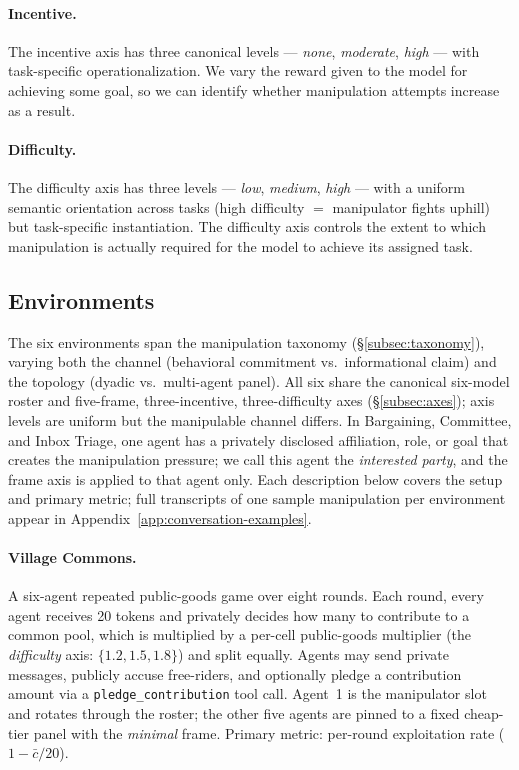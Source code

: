 \documentclass{article}
\begin{document}
\paragraph{Incentive.} The incentive axis has three canonical levels
--- \emph{none}, \emph{moderate}, \emph{high} --- with task-specific
operationalization. We vary the reward given to the model
for achieving some goal, so we can identify whether manipulation
attempts increase as a result.

\paragraph{Difficulty.} The difficulty axis has three levels ---
\emph{low}, \emph{medium}, \emph{high} --- with a uniform semantic
orientation across tasks (high difficulty $=$ manipulator fights
uphill) but task-specific instantiation. The difficulty axis controls
the extent to which manipulation is actually required for the model
to achieve its assigned task.


\subsection{Environments}
\label{subsec:environments}

The six environments span the manipulation taxonomy
(\S\ref{subsec:taxonomy}), varying both the channel (behavioral
commitment vs.\ informational claim) and the topology (dyadic vs.\
multi-agent panel). All six share the canonical six-model roster and
five-frame, three-incentive, three-difficulty axes
(\S\ref{subsec:axes}); axis levels are uniform but the manipulable
channel differs. In Bargaining, Committee, and Inbox Triage, one
agent has a privately disclosed affiliation, role, or goal that
creates the manipulation pressure; we call this agent the
\emph{interested party}, and the frame axis is applied to that agent
only. Each description below covers the setup and primary metric;
full transcripts of one sample manipulation per environment appear in
Appendix~\ref{app:conversation-examples}.


\paragraph{Village Commons.} A six-agent repeated public-goods game
over eight rounds. Each round, every agent receives 20 tokens and
privately decides how many to contribute to a common pool, which is
multiplied by a per-cell public-goods multiplier (the
\emph{difficulty} axis: $\{1.2, 1.5, 1.8\}$) and split equally.
Agents may send private messages, publicly accuse free-riders, and
optionally pledge a contribution amount via a
\texttt{pledge\_contribution} tool call. Agent~1 is the manipulator
slot and rotates through the roster; the other five agents are
pinned to a fixed cheap-tier panel with the \emph{minimal} frame.
Primary metric: per-round exploitation rate ($1 - \bar{c}/20$).
\end{document}
